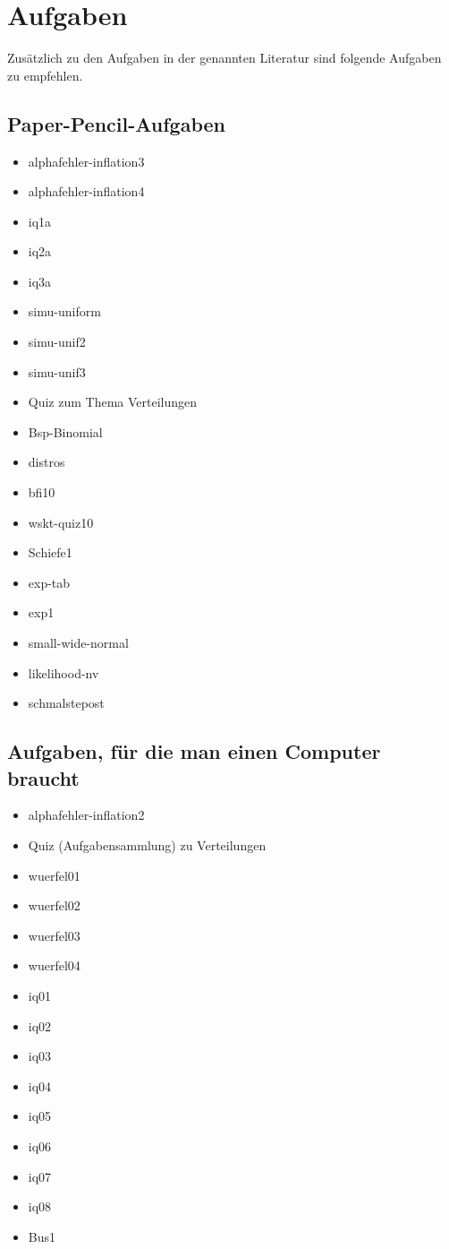 \documentclass[
  ngerman,
  letterpaper,
  twoside,
  open=any]{scrbook}
\providecommand{\tightlist}{%
  \setlength{\itemsep}{0pt}\setlength{\parskip}{0pt}}\usepackage{longtable,booktabs,array}
\theoremstyle{definition}
\theoremstyle{plain}
\theoremstyle{definition}
\theoremstyle{definition}
\theoremstyle{definition}
\theoremstyle{definition}
\theoremstyle{remark}
\begin{document}
\section{Aufgaben}\label{aufgaben-4}

Zusätzlich zu den Aufgaben in der genannten Literatur sind folgende
Aufgaben zu empfehlen.

\subsection{Paper-Pencil-Aufgaben}\label{paper-pencil-aufgaben-3}

\begin{itemize}
\tightlist
\item
  alphafehler-inflation3
\item
  alphafehler-inflation4
\item
  iq1a
\item
  iq2a
\item
  iq3a
\item
  simu-uniform
\item
  simu-unif2
\item
  simu-unif3
\item
  Quiz zum Thema Verteilungen
\item
  Bsp-Binomial
\item
  distros
\item
  bfi10
\item
  wskt-quiz10
\item
  Schiefe1
\item
  exp-tab
\item
  exp1
\item
  small-wide-normal
\item
  likelihood-nv
\item
  schmalstepost
\end{itemize}

\subsection{Aufgaben, für die man einen Computer
braucht}\label{aufgaben-fuxfcr-die-man-einen-computer-braucht-3}

\begin{itemize}
\tightlist
\item
  alphafehler-inflation2
\item
  Quiz (Aufgabensammlung) zu Verteilungen
\item
  wuerfel01
\item
  wuerfel02
\item
  wuerfel03
\item
  wuerfel04
\item
  iq01
\item
  iq02
\item
  iq03
\item
  iq04
\item
  iq05
\item
  iq06
\item
  iq07
\item
  iq08
\item
  Bus1
\end{itemize}
\end{document}
